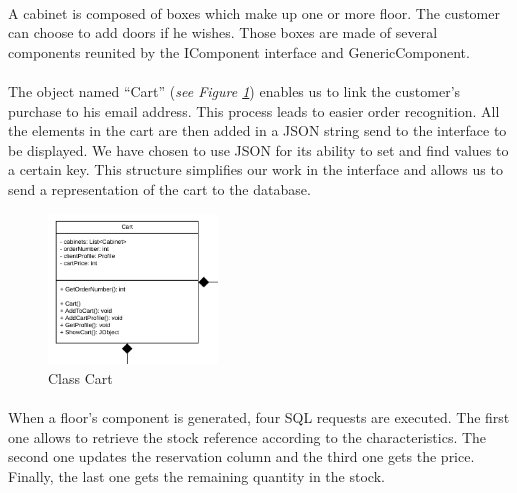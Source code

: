 \documentclass[12pt,oneside]{report}
\begin{document}
        \paragraph{}
        A cabinet is composed of boxes which make up one or more floor. The customer can choose to add doors if he wishes. Those boxes are made of several components reunited by the IComponent interface and GenericComponent.
        
        \paragraph{}
        The object named “Cart” (\textit{see Figure \ref{cartclass}}) enables us to link the customer’s purchase to his email address. This process leads to easier order recognition. All the elements in the cart are then added in a JSON string send to the interface to be displayed. We have chosen to use JSON for its ability to set and find values to a certain key. This structure simplifies our work in the interface and allows us to send a representation of the cart to the database. 
        \vspace{\baselineskip}
         
        \begin{figure}[h!]
            \centering
			\includegraphics[width = 0.4\textwidth]{Figures/CartClass.png}
			\caption{Class Cart}
			\label{cartclass}
		\end{figure} 
		
		\newpage
        \paragraph{}
        When a floor’s component is generated, four SQL requests are executed. The first one allows to retrieve the stock reference according to the characteristics. The second one updates the reservation column and the third one gets the price. Finally, the last one gets the remaining quantity in the stock.
        
        
\end{document}
